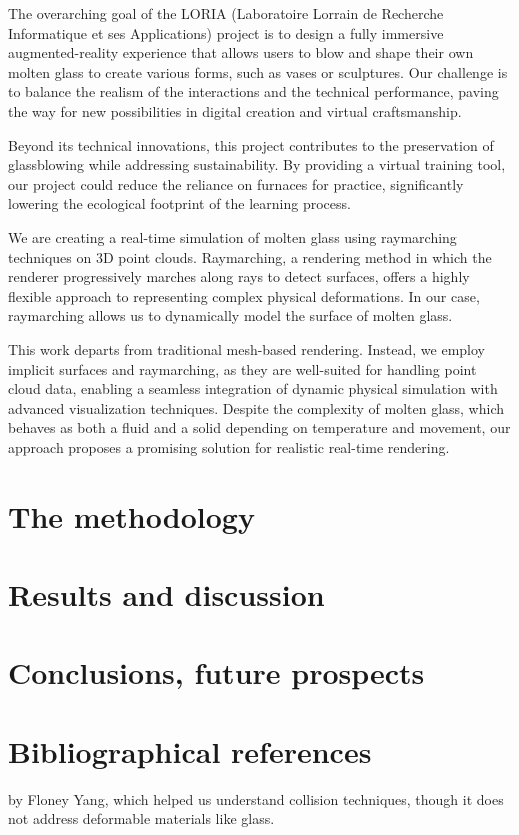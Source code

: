 \documentclass{rapportcs}
\begin{document}
    The overarching goal of the LORIA (Laboratoire Lorrain de Recherche Informatique et ses Applications) project is to design a fully immersive augmented-reality experience that allows users to blow and shape their own molten glass to create various forms, such as vases or sculptures. Our challenge is to balance the realism of the interactions and the technical performance, paving the way for new possibilities in digital creation and virtual craftsmanship.

    Beyond its technical innovations, this project contributes to the preservation of glassblowing while addressing sustainability. By providing a virtual training tool, our project could reduce the reliance on furnaces for practice, significantly lowering the ecological footprint of the learning process.

    We are creating a real-time simulation of molten glass using raymarching techniques on 3D point clouds. Raymarching, a rendering method in which the renderer progressively marches along rays to detect surfaces, offers a highly flexible approach to representing complex physical deformations. In our case, raymarching allows us to dynamically model the surface of molten glass.

    This work departs from traditional mesh-based rendering. Instead, we employ implicit surfaces and raymarching, as they are well-suited for handling point cloud data, enabling a seamless integration of dynamic physical simulation with advanced visualization techniques. Despite the complexity of molten glass, which behaves as both a fluid and a solid depending on temperature and movement, our approach proposes a promising solution for realistic real-time rendering.

    \newpage
    \section{The methodology}

    \newpage
    \section{Results and discussion}

    \newpage
    \section{Conclusions, future prospects}

    \newpage
    \section{Bibliographical references}
   \cite{yang_raymarching_2024} by Floney Yang, which helped us understand collision techniques, though it does not address deformable materials like glass.
\end{document}
